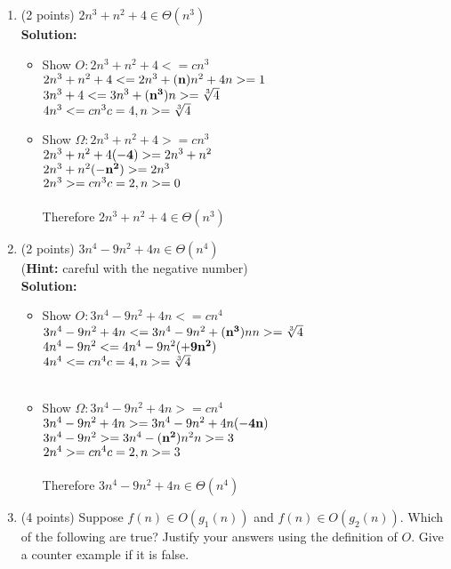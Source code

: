 \documentclass[12pt]{elsart}
\begin{document}
\begin{enumerate}
   \item (2 points) $2n^3+n^2+4\in \Theta(n^3)$\\
	{\bf Solution:}
	\begin{itemize}
	\item Show $O: 2n^3 + n^2 +4 <= cn^3$\\
		$2n^3+n^2+4 <= 2n^3+{\bf (n)}n^2+4 \hfill n>=1$\\
		$3n^3+4 <= 3n^3+{\bf (n^3)} \hfill n>= \sqrt[3]{4}$\\
		$4n^3 <= cn^3 \hfill c=4, n>=\sqrt[3]{4}$\\
	\item Show $\Omega: 2n^3+n^2+4 >= cn^3$\\
		$2n^3+n^2+4{\bf (-4)} >= 2n^3+n^2$\\
		$2n^3+n^2{\bf (-n^2)} >= 2n^3$\\
		$2n^3 >= cn^3 \hfill c=2, n>=0$\\\\
	Therefore $2n^3+n^2+4\in \Theta(n^3)$\\
	\end{itemize}
   \item (2 points) $3n^4-9n^2+4n\in \Theta(n^4)$\\  ({\bf Hint:} careful with the negative number)\\
	{\bf Solution:}
	\begin{itemize}
	\item Show $O: 3n^4-9n^2+4n <= cn^4$\\
		$3n^4-9n^2+4n <= 3n^4-9n^2+{\bf (n^3)}n \hfill n>=\sqrt[3]{4}$\\
		$4n^4-9n^2 <= 4n^4-9n^2{\bf (+9n^2)}$\\
		$4n^4 <= cn^4 \hfill c=4, n>=\sqrt[3]{4}$\\\\
	\item Show $\Omega: 3n^4-9n^2+4n >= cn^4$\\
		$3n^4-9n^2+4n >= 3n^4-9n^2+4n{\bf (-4n)}$\\
		$3n^4-9n^2 >= 3n^4-{\bf (n^2)}n^2 \hfill n>=3$\\
		$2n^4 >= cn^4 \hfill c=2, n>=3$\\\\
	Therefore $3n^4-9n^2+4n\in \Theta(n^4)$\\
	\end{itemize}
   \item (4 points) Suppose $f(n)\in O(g_1(n))$ and $f(n)\in O(g_2(n))$.  Which of the following are true?  Justify your answers using the definition of $O$.  Give a counter example if it is false.

\end{enumerate}
\end{document}
